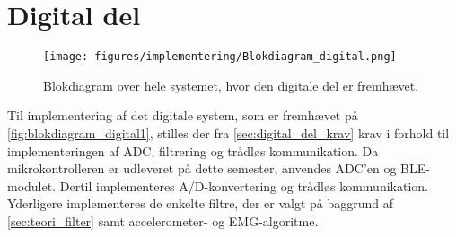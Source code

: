 \section{Digital del}

\begin{figure}[H]
\centering
\texttt{[image: figures/implementering/Blokdiagram\_digital.png]}
\caption{Blokdiagram over hele systemet, hvor den digitale del er fremhævet.}
\label{fig:blokdiagram_digital1}
\end{figure}

Til implementering af det digitale system, som er fremhævet på \autoref{fig:blokdiagram_digital1}, stilles der fra \autoref{sec:digital_del_krav} krav i forhold til implementeringen af ADC, filtrering og trådløs kommunikation. 
Da mikrokontrolleren er udleveret på dette semester, anvendes ADC'en og BLE-modulet. 
Dertil implementeres A/D-konvertering og trådløs kommunikation. 
Yderligere implementeres de enkelte filtre, der er valgt på baggrund af \autoref{sec:teori_filter} samt accelerometer- og EMG-algoritme. 

